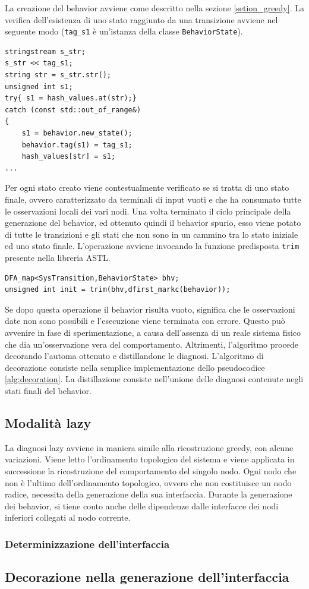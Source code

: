 La creazione del behavior avviene come descritto nella sezione \ref{setion_greedy}.
La verifica dell'esistenza di uno stato raggiunto da una transizione avviene nel seguente modo (\verb|tag_s1| è un'istanza della classe \verb|BehaviorState|).

\begin{verbatim}
stringstream s_str;
s_str << tag_s1;
string str = s_str.str();
unsigned int s1;
try{ s1 = hash_values.at(str);}
catch (const std::out_of_range&)
{
    s1 = behavior.new_state();
    behavior.tag(s1) = tag_s1;
    hash_values[str] = s1;
...
\end{verbatim}

Per ogni stato creato viene contestualmente verificato se si tratta di uno stato finale, ovvero caratterizzato da terminali di input vuoti e che ha consumato tutte le osservazioni locali dei vari nodi.
Una volta terminato il ciclo principale della generazione del behavior, ed ottenuto quindi il behavior spurio, esso viene potato di tutte le transizioni e gli stati che non sono in un cammino tra lo stato iniziale ed uno stato finale. L'operazione avviene invocando la funzione predisposta \verb|trim| presente nella libreria ASTL.

\begin{verbatim}
DFA_map<SysTransition,BehaviorState> bhv;
unsigned int init = trim(bhv,dfirst_markc(behavior));
\end{verbatim}

Se dopo questa operazione il behavior risulta vuoto, significa che le osservazioni date non sono possibili e l'esecuzione viene terminata con errore. Questo può avvenire in fase di sperimentazione, a causa dell'assenza di un reale sistema fisico che dia un'osservazione vera del comportamento.
Altrimenti, l'algoritmo procede decorando l'automa ottenuto e distillandone le diagnosi.
L'algoritmo di decorazione consiste nella semplice implementazione dello pseudocodice \ref{alg:decoration}. La distillazione consiste nell'unione delle diagnosi contenute negli stati finali del behavior.

\subsection{Modalità lazy}
La diagnosi lazy avviene in maniera simile alla ricostruzione greedy, con alcune variazioni. 
Viene letto l'ordinamento topologico del sistema e viene applicata in successione la ricostruzione del comportamento del singolo nodo. Ogni nodo che non è l'ultimo dell'ordinamento topologico, ovvero che non costituisce un nodo radice, necessita della generazione della sua interfaccia. Durante la generazione dei behavior, si tiene conto anche delle dipendenze dalle interfacce dei nodi inferiori collegati al nodo corrente.


\subsubsection{Determinizzazione dell'interfaccia}

\subsection{Decorazione nella generazione dell'interfaccia}

